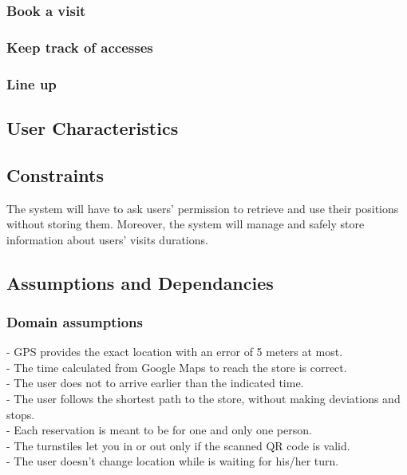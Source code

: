 \documentclass{article}
\begin{document}
\subsubsection{Book a visit} 
\subsubsection{Keep track of accesses} 
\subsubsection{Line up} 
\subsection{User Characteristics}
\subsection{Constraints}
The system will have to ask users' permission to retrieve and use their positions without storing them. Moreover, the system will manage and safely store information about users' visits durations.
\subsection{Assumptions and Dependancies}
\subsubsection{Domain assumptions}
\noindent\medskip
[D1] - GPS provides the exact location with an error of 5 meters at most.\\
\noindent\medskip
[D2] - The time calculated from Google Maps to reach the store is correct.\\
\noindent\medskip
[D3] - The user does not to arrive earlier than the indicated time.\\
\noindent\medskip
[D4] - The user follows the shortest path to the store, without making deviations and stops.\\
\noindent\medskip
[D5] - Each reservation is meant to be for one and only one person.\\
\noindent\medskip
[D6] - The turnstiles let you in or out only if the scanned QR code is valid.\\
\noindent\medskip
[D7] - The user doesn't change location while is waiting for his/her turn.\\
\end{document}
